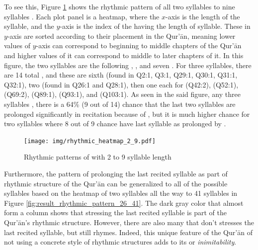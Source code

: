 To see this, Figure \ref{fig:result_rhythmic_pattern_2_9} shows the rhythmic pattern of all two syllables   to nine syllables  . Each plot panel is a heatmap, where the $x$-axis is the length of the syllable, and the $y$-axis is the index of the   having the length of syllable. These   in $y$-axis are sorted according to their placement in the Qur'\=an, meaning lower values of $y$-axis can correspond to beginning to middle chapters of the Qur'\=an and higher values of it can correspond to middle to later chapters of it. In this figure, the two syllables are the following  ,  \;, and seven  . For three syllables, there are 14 total  , and these are sixth   (found in Q2:1, Q3:1, Q29:1, Q30:1, Q31:1, Q32:1), two \; (found in Q26:1 and Q28:1), then one each for   (Q42:2),   (Q52:1),   (Q69:2),   (Q89:1),   (Q93:1), and   (Q103:1). As seen in the said figure, any three syllables  , there is a 64\% (9 out of 14) chance that the last two syllables are prolonged significantly in recitation because of  , but it is much higher chance for two syllables where 8 out of 9 chance have last syllable as prolonged by  .

\begin{figure}[!t]
    \centering
    \texttt{[image: img/rhythmic\_heatmap\_2\_9.pdf]}
    \caption{Rhythmic patterns of   with 2 to 9 syllable length}
    \label{fig:result_rhythmic_pattern_2_9}
\end{figure}

Furthermore, the pattern of prolonging the last recited syllable as part of rhythmic structure of the Qur'\=an can be generalized to all of the possible syllables based on the heatmap of two syllables all the way to 41 syllables in Figure \ref{fig:result_rhythmic_pattern_26_41}. The dark gray color that almost form a column shows that stressing the last recited syllable is part of the Qur'\=an's rhythmic structure. However, there are also many   that don't stresses the last recited syllable, but still rhymes. Indeed, this unique feature of the Qur'\=an of not using a concrete style of rhythmic structures adds to its   or \textit{inimitability}.

